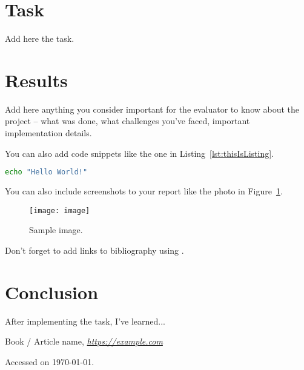 \documentclass[12pt,a4paper]{article}
\begin{document}


\section{Task}
Add here the task.

\section{Results}

Add here anything you consider important for the evaluator to know about the project -- what was done, what challenges you've faced, important implementation details.

You can also add code snippets like the one in Listing~\ref{lst:thisIsListing}.

\begin{lstlisting}[language=Bash, caption={Sample listing.}, label=lst:thisIsListing]
echo "Hello World!"
\end{lstlisting}


You can also include screenshots to your report like the photo in Figure~\ref{fig:thisIsImage}.

\begin{figure}[!h]
  \centering
  \texttt{[image: image]}
  \caption{Sample image.}
  \label{fig:thisIsImage}
\end{figure}

Don't forget to add links to bibliography using \texttt{\cite{thisIsBibliographyReference}}.

\section{Conclusion}

After implementing the task, I've learned...

\begin{thebibliography}{9}
    Book / Article name,
    \textit{\url{https://example.com}}

    Accessed on \today .
\end{thebibliography}
\end{document}
